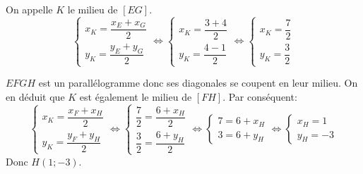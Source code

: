\documentclass[a4paper]{article}
\begin{document}
    \medskip
    \begin{exercice}{}{}
    
        On appelle $K$ le milieu de $[EG]$.
        $$
        \left\{
            \begin{array}{ll}
                x_K=\dfrac{x_E+x_G}{2} \\
                y_K=\dfrac{y_E+y_G}{2}
            \end{array}
        \right.\iff
        \left\{
            \begin{array}{ll}
                x_K=\dfrac{3+4}{2} \\
                y_K=\dfrac{4-1}{2}
            \end{array}
        \right.\iff
        \left\{
            \begin{array}{ll}
                x_K=\dfrac{7}{2} \\
                y_K=\dfrac{3}{2}
            \end{array}
        \right.
        $$

        $EFGH$ est un parallélogramme donc ses diagonales se coupent en leur milieu. On en déduit que $K$ est également le milieu 
        de $[FH]$. Par conséquent:
        $$
        \left\{
            \begin{array}{ll}
                x_K=\dfrac{x_F+x_H}{2} \\
                y_K=\dfrac{y_F+y_H}{2}
            \end{array}
        \right.\iff
        \left\{
            \begin{array}{ll}
                \dfrac{7}{2}=\dfrac{6+x_H}{2} \\
                \dfrac{3}{2}=\dfrac{6+y_H}{2}
            \end{array}
        \right.\iff
        \left\{
            \begin{array}{ll}
                7=6+x_H \\
                3=6+y_H
            \end{array}
        \right.\iff
        \left\{
            \begin{array}{ll}
                x_H=1 \\
                y_H=-3
            \end{array}
        \right.
        $$
        Donc $H\left(1;-3\right)$.

    \end{exercice}
    
\end{document}
